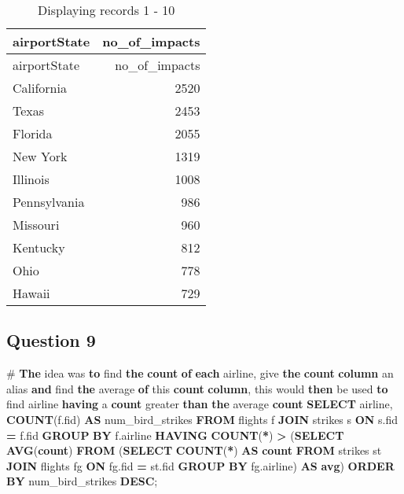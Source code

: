 \documentclass[
]{article}
\newenvironment{Shaded}{\begin{snugshade}}{\end{snugshade}}
\newcommand{\ControlFlowTok}[1]{\textcolor[rgb]{0.13,0.29,0.53}{\textbf{#1}}}
\newcommand{\FunctionTok}[1]{\textcolor[rgb]{0.13,0.29,0.53}{\textbf{#1}}}
\newcommand{\KeywordTok}[1]{\textcolor[rgb]{0.13,0.29,0.53}{\textbf{#1}}}
\newcommand{\NormalTok}[1]{#1}
\newcommand{\OperatorTok}[1]{\textcolor[rgb]{0.81,0.36,0.00}{\textbf{#1}}}
\begin{document}
\begin{longtable}[]{@{}lr@{}}
\caption{Displaying records 1 - 10}\tabularnewline
\toprule\noalign{}
airportState & no\_of\_impacts \\
\midrule\noalign{}
\endfirsthead
\toprule\noalign{}
airportState & no\_of\_impacts \\
\midrule\noalign{}
\endhead
\bottomrule\noalign{}
\endlastfoot
California & 2520 \\
Texas & 2453 \\
Florida & 2055 \\
New York & 1319 \\
Illinois & 1008 \\
Pennsylvania & 986 \\
Missouri & 960 \\
Kentucky & 812 \\
Ohio & 778 \\
Hawaii & 729 \\
\end{longtable}

\hypertarget{question-9}{%
\subsection{Question 9}\label{question-9}}

\begin{Shaded}
\begin{Highlighting}[]
\NormalTok{\# }\KeywordTok{The}\NormalTok{ idea was }\KeywordTok{to}\NormalTok{ find }\KeywordTok{the} \FunctionTok{count} \KeywordTok{of} \KeywordTok{each}\NormalTok{ airline, give }\KeywordTok{the} \FunctionTok{count} \KeywordTok{column}\NormalTok{ an alias }\KeywordTok{and}\NormalTok{ find }\KeywordTok{the}\NormalTok{ average }\KeywordTok{of}\NormalTok{ this }\FunctionTok{count} \KeywordTok{column}\NormalTok{, this would }\ControlFlowTok{then}\NormalTok{ be used }\KeywordTok{to}\NormalTok{ find airline }\KeywordTok{having}\NormalTok{ a }\FunctionTok{count}\NormalTok{ greater }\KeywordTok{than} \KeywordTok{the}\NormalTok{ average }\FunctionTok{count}
\KeywordTok{SELECT}\NormalTok{ airline, }\FunctionTok{COUNT}\NormalTok{(f.fid) }\KeywordTok{AS}\NormalTok{ num\_bird\_strikes}
\KeywordTok{FROM}\NormalTok{ flights f}
\KeywordTok{JOIN}\NormalTok{ strikes s }\KeywordTok{ON}\NormalTok{ s.fid }\OperatorTok{=}\NormalTok{ f.fid}
\KeywordTok{GROUP} \KeywordTok{BY}\NormalTok{ f.airline}
\KeywordTok{HAVING} \FunctionTok{COUNT}\NormalTok{(}\OperatorTok{*}\NormalTok{) }\OperatorTok{\textgreater{}} 
\NormalTok{            (}\KeywordTok{SELECT} \FunctionTok{AVG}\NormalTok{(}\FunctionTok{count}\NormalTok{) }
              \KeywordTok{FROM}\NormalTok{ (}\KeywordTok{SELECT} \FunctionTok{COUNT}\NormalTok{(}\OperatorTok{*}\NormalTok{) }\KeywordTok{AS} \FunctionTok{count} \KeywordTok{FROM}\NormalTok{ strikes st }\KeywordTok{JOIN}\NormalTok{ flights fg }\KeywordTok{ON}\NormalTok{ fg.fid }\OperatorTok{=}\NormalTok{ st.fid }\KeywordTok{GROUP} \KeywordTok{BY}\NormalTok{ fg.airline) }\KeywordTok{AS} \FunctionTok{avg}\NormalTok{)}
\KeywordTok{ORDER} \KeywordTok{BY}\NormalTok{ num\_bird\_strikes }\KeywordTok{DESC}\NormalTok{;}
\end{Highlighting}
\end{Shaded}
\end{document}
